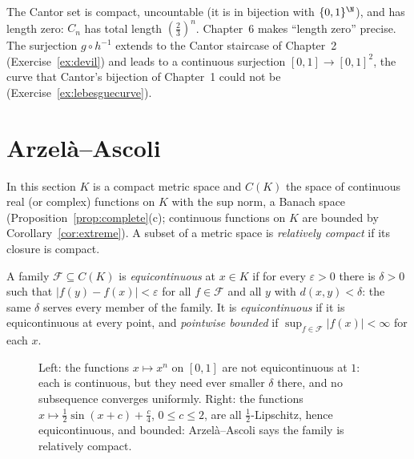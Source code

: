 The Cantor set is compact, uncountable (it is in bijection with $\{0,1\}^\N$), and has length zero: $C_n$ has total length $(\frac23)^n$. Chapter~6 makes ``length
zero'' precise. The surjection $g\circ h^{-1}$ extends to the Cantor staircase of Chapter~2 (Exercise~\ref{ex:devil}) and leads to a continuous surjection
$[0,1]\to[0,1]^2$, the curve that Cantor's bijection of Chapter~1 could not be (Exercise~\ref{ex:lebesguecurve}).

\section{Arzel\`a--Ascoli}\label{sec:ascoli}

In this section $K$ is a compact metric space and $C(K)$ the space of continuous real (or complex) functions on $K$ with the sup norm, a Banach space
(Proposition~\ref{prop:complete}(c); continuous functions on $K$ are bounded by Corollary~\ref{cor:extreme}). A subset of a metric space is \emph{relatively compact}
if its closure is compact.

\begin{definition}
A family $\mathcal F\subseteq C(K)$ is \emph{equicontinuous} at $x\in K$ if for every $\varepsilon>0$ there is $\delta>0$ such that $|f(y)-f(x)|<\varepsilon$ for all $f\in\mathcal F$ and all $y$ with $d(x,y)<\delta$: the
same $\delta$ serves every member of the family. It is \emph{equicontinuous} if it is equicontinuous at every point, and \emph{pointwise bounded} if
$\sup_{f\in\mathcal F}|f(x)|<\infty$ for each $x$.
\end{definition}

\begin{figure}[ht]
\centering
{}
\caption{Left: the functions $x\mapsto x^n$ on $[0,1]$ are not equicontinuous at $1$: each is continuous, but they need ever smaller $\delta$ there, and no
subsequence converges uniformly. Right: the functions $x\mapsto\frac12\sin(x+c)+\frac c4$, $0\le c\le2$, are all $\frac12$-Lipschitz, hence equicontinuous, and bounded: Arzel\`a--Ascoli
says the family is relatively compact.}
\label{fig:equicont}
\end{figure}

